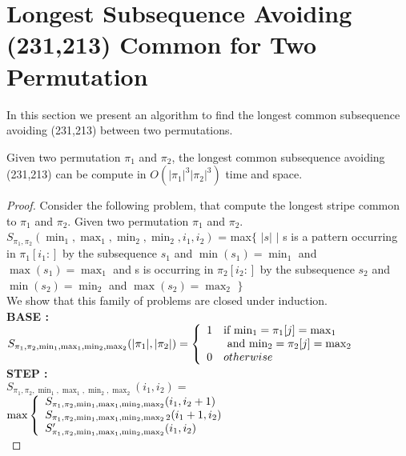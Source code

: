 \documentclass[a4paper]{llncs}
\begin{document}
	\section{Longest Subsequence Avoiding \\(231,213) Common for Two Permutation}
	
	In this section we present an algorithm to find 
	the longest common subsequence avoiding (231,213) 
	between two permutations.\\

	\begin{proposition}
	Given two permutation $\pi_1$ and $\pi_2$,
	the longest common subsequence
	avoiding (231,213) can be compute in $O(|\pi_1|^3|\pi_2|^3)$ time and space.	
	\end{proposition}
	
	\begin{proof}
	Consider the following problem, 
	that compute the longest stripe common to $\pi_1$ and $\pi_2$.
	Given two permutation $\pi_1$ and $\pi_2$.\\
	
	$S_{\pi_1,\pi_2}(\min_1,\max_1,\min_2,\min_2,i_1,i_2)$
	= max$\{$ $|s|$ $|$ 
	s is a pattern occurring 
	in  $\pi_1[i_1:]$
	by the subsequence $s_1$ and $\min(s_1)=\min_1$ and $\max(s_1)=\max_1$
	and s is occurring
	in  $\pi_2[i_2:]$
	by the subsequence $s_2$ and $\min(s_2)=\min_2$ and $\max(s_2)=\max_2$	
	$\}$\\
	
	We show that this family of problems are closed under induction.\\


	\textbf{BASE :} \\
	$S_{\pi_1,\pi_2,\min_1,\max_1,\min_2,\max_2}(|\pi_1|,|\pi_2|) = \left\{ 
			\begin{array}{l l}
				1 & \text{if $\min_1=\pi_1[j]=\max_1$  
				}\\
				& \text{ and $\min_2=\pi_2[j]=\max_2$}\\
				0 & otherwise\\
			\end{array} \right. $\\	

	\textbf{STEP :} \\	
	
	$S_{\pi_1,\pi_2,\min_1,\max_1,\min_2,\max_2}(i_1,i_2) =$\\
	\indent $ \max \left\{ 
			\begin{array}{l l}
				S_{\pi_1,\pi_2,\min_1,\max_1,\min_2,\max_2}(i_1,i_2+1) \\
				S_{\pi_1,\pi_2,\min_1,\max_1,\min_2,\max_22}(i_1+1,i_2) \\
				S'_{\pi_1,\pi_2,\min_1,\max_1,\min_2,\max_2}(i_1,i_2)
			\end{array} \right. $\vspace{20pt}\\	
	

\end{proof}
\end{document}
